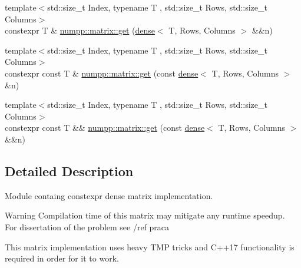 \begin{DoxyCompactItemize}
\item 
{\footnotesize template$<$std\+::size\+\_\+t Index, typename T , std\+::size\+\_\+t Rows, std\+::size\+\_\+t Columns$>$ }\\constexpr T \& \hyperlink{group__numpp__structures__matrices__dense_ga161ec12506af265f6c407b695b06974c}{numpp\+::matrix\+::get} (\hyperlink{classnumpp_1_1matrix_1_1dense}{dense}$<$ T, Rows, Columns $>$ \&\&n)
\item 
{\footnotesize template$<$std\+::size\+\_\+t Index, typename T , std\+::size\+\_\+t Rows, std\+::size\+\_\+t Columns$>$ }\\constexpr const T \& \hyperlink{group__numpp__structures__matrices__dense_ga5587c6c4095d1147e35da4860e22df52}{numpp\+::matrix\+::get} (const \hyperlink{classnumpp_1_1matrix_1_1dense}{dense}$<$ T, Rows, Columns $>$ \&n)
\item 
{\footnotesize template$<$std\+::size\+\_\+t Index, typename T , std\+::size\+\_\+t Rows, std\+::size\+\_\+t Columns$>$ }\\constexpr const T \&\& \hyperlink{group__numpp__structures__matrices__dense_ga8a016cefdf00f72d041d313318e7a2fc}{numpp\+::matrix\+::get} (const \hyperlink{classnumpp_1_1matrix_1_1dense}{dense}$<$ T, Rows, Columns $>$ \&\&n)
\end{DoxyCompactItemize}


\subsection{Detailed Description}
Module containg constexpr dense matrix implementation. 

{\bfseries \begin{DoxyWarning}{Warning}
Compilation time of this matrix may mitigate any runtime speedup.~\newline
For dissertation of the problem see /ref praca 
\end{DoxyWarning}
This matrix implementation uses heavy T\+MP tricks and C++17 functionality is required in order for it to work.}

